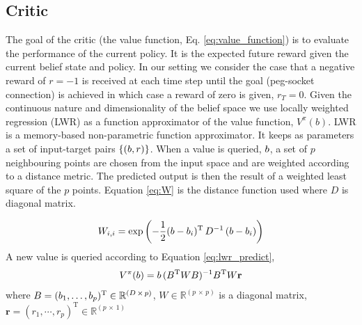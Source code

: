 \subsection{Critic}

% 
%


The goal of the critic (the value function, Eq. \ref{eq:value_function}) is to evaluate 
the performance of the current policy. It is the expected future reward given the current 
belief state and policy.
In our setting we consider the case that a negative reward of $r=-1$ is received at each time step
until the goal (peg-socket connection) is achieved in which case a reward of zero is given, $r_{T}=0$.
Given the continuous nature and dimensionality of the belief space we use locally weighted regression \cite{Atkeson97locallyweighted}
(LWR) as a function approximator of the value function, $V^{\pi}(b)$. LWR is a memory-based non-parametric function 
approximator. It keeps as parameters a set of input-target pairs $\{(b,r)\}$. When a value is 
queried, $b$, a set of $p$ neighbouring points are chosen from the input space and are 
weighted according to a distance metric. The predicted output is then the result of a weighted 
least square of the $p$ points. Equation \ref{eq:W} is the distance function used where 
$D$ is diagonal matrix.

\begin{equation}\label{eq:W}
 W_{i,i}  = \exp\left(-\frac{1}{2}(b - b_i)^{\mathrm{T}}\, D^{-1} \, (b - b_i) \right)
\end{equation}
A new value is queried according to Equation \ref{eq:lwr_predict},
\begin{equation}\label{eq:lwr_predict}
  V^{\pi}(b) = b \,(B^{\mathrm{T}} W B)^{-1} B^{\mathrm{T}} W \mathbf{r}
\end{equation}
where $B = (b_1,\dots,b_p)^{\mathrm{T}} \in \mathbb{R}^{(D\, \times\, p)}$, $W \in \mathbb{R}^{(p\, \times\, p)}$ is
a diagonal matrix, $\mathbf{r} = (r_1,\cdots,r_p)^{\mathrm{T}} \in \mathbb{R}^{(p\, \times\, 1)}$


